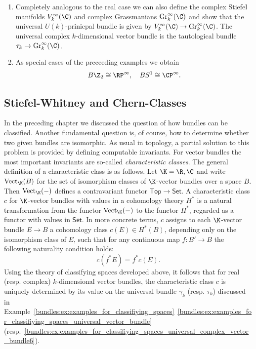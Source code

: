 \begin{example}
\begin{enumerate}[label=(\roman*)]
        
        \item \label{bundles:ex:examples_for_classifiying_spaces_universal_complex_vector_bundle}Completely analogous to the real case we can also define the complex Stiefel manifolds $V_k^\infty(\C)$ and complex Grassmanians $\mathrm{Gr}_k^\infty(\C)$ and show that the universal $U(k)$-prinicpal bundle is given by $V_k^\infty(\C) \to \mathrm{Gr}_k^\infty(\C)$. The universal complex $k$-dimensional vector bundle is the tautological bundle $\tau_k \to \mathrm{Gr}_k^\infty(\C)$. 
        \item \label{bundles:es:examples_for_classifying_spaces_special_case}As special cases of the preceeding examples we obtain
        \[
        B\Z_2 \cong \RP^\infty, \quad BS^1 \cong \CP^\infty. 
        \]
    \end{enumerate}
\end{example}



\subsection{Stiefel-Whitney and Chern-Classes}

In the preceding chapter we discussed the question of how bundles can be classified. Another fundamental question is, of course, how to determine whether two given bundles are isomorphic. As usual in topology, a partial solution to this problem is provided by defining computable invariants. For vector bundles the most important invariants are so-called \textit{characteristic classes}. The general definition of a characteristic class is as follows. Let $\K = \R, \C$ and write $\mathrm{Vect}_\K(B)$ for the set of isomorphism classes of $\K$-vector bundles over a space $B$. Then $\mathrm{Vect}_\K(-)$ defines a contravariant functor $\mathsf{Top} \to \mathsf{Set}$. A characteristic class $c$ for $\K$-vector bundles with values in a cohomology theory $H^\ast$ is a natural transformation from the functor $\mathrm{Vect}_\K(-)$ to the functor $H^\ast$, regarded as a functor with values in $\mathsf{Set}$. In more concrete terms, $c$ assigns to each $\K$-vector bundle $E \to B$ a cohomology class $c(E) \in H^\ast(B)$, depending only on the isomorphism class of $E$, such that for any continuous map $f \colon B' \to B$ the following naturality condition holds:
\[
c(f^\ast E) = f^\ast c(E).
\]
Using the theory of classifying spaces developed above, it follows that for real (resp. complex) $k$-dimensional vector bundles, the characteristic class $c$ is uniquely determined by its value on the universal bundle $\gamma_k$ (resp. $\tau_k$) discussed in Example~\ref{bundles:ex:examples_for_classifiying_spaces}~\ref{bundles:ex:examples_for_classifiying_spaces_universal_vector_bundle} (resp.~\ref{bundles:ex:examples_for_classifiying_spaces_universal_complex_vector_bundle6}).

